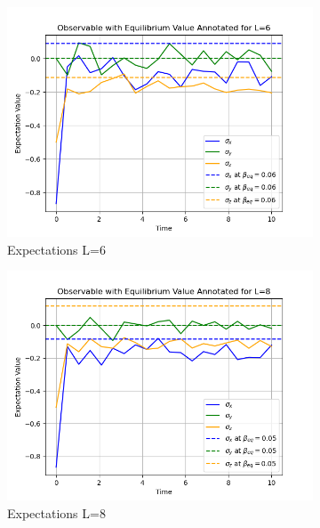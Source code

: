 \documentclass[12pt]{article}
\begin{document}
\begin{figure}[htbp]
    \begin{subfigure}[b]{0.32\textwidth}
        \includegraphics[width=\textwidth]{p4_3_1_expectation_L6.png}
        \caption{Expectations L=6}
    \end{subfigure}
    \begin{subfigure}[b]{0.32\textwidth}
        \includegraphics[width=\textwidth]{p4_3_1_expectation_L8.png}
        \caption{Expectations L=8}
    \end{subfigure}
    \begin{subfigure}[b]{0.32\textwidth}

\end{subfigure}
\end{figure}
\end{document}
